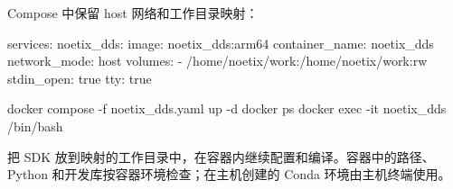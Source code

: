 Compose 中保留 host 网络和工作目录映射：
\par\noindent\begin{minipage}{\linewidth}
\begin{command}
services:
  noetix_dds:
    image: noetix_dds:arm64
    container_name: noetix_dds
    network_mode: host
    volumes:
      - /home/noetix/work:/home/noetix/work:rw
    stdin_open: true
    tty: true
\end{command}
\end{minipage}\par

\par\noindent\begin{minipage}{\linewidth}
\begin{command}
docker compose -f noetix_dds.yaml up -d
docker ps
docker exec -it noetix_dds /bin/bash
\end{command}
\end{minipage}\par

把 SDK 放到映射的工作目录中，在容器内继续配置和编译。容器中的路径、Python 和开发库按容器环境检查；在主机创建的 Conda 环境由主机终端使用。
